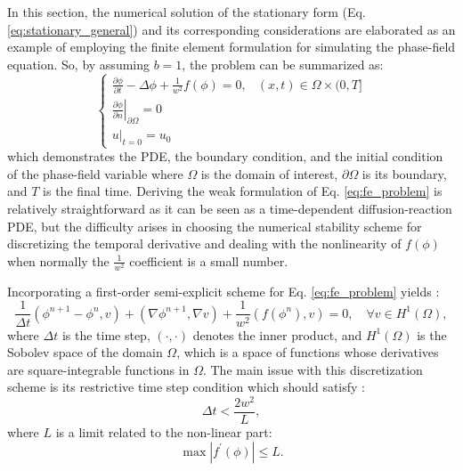In this section, the numerical solution of the stationary form (Eq. \ref{eq:stationary_general}) and its corresponding considerations are elaborated as an example of employing the finite element formulation for simulating the phase-field equation. So, by assuming $b=1$, the problem can be summarized as:
\begin{equation} \label{eq:fe_problem}
\left\{\begin{array}{ll}
\frac{\partial \phi}{\partial t}-\Delta \phi+\frac{1}{w^{2}} f(\phi)=0, & (x, t) \in \Omega \times(0, T] \\
\left.\frac{\partial \phi}{\partial n} \right|_{\partial \Omega}=0 \\
\left.u\right|_{t=0}=u_{0}
\end{array}\right.
\end{equation}
which demonstrates the \gls{PDE}, the boundary condition, and the initial condition of the phase-field variable where $\Omega$ is the domain of interest, $\partial \Omega$ is its boundary, and $T$ is the final time. Deriving the weak formulation of Eq. \ref{eq:fe_problem} is relatively straightforward as it can be seen as a time-dependent diffusion-reaction \gls{PDE}, but the difficulty arises in choosing the numerical stability scheme for discretizing the temporal derivative and dealing with the nonlinearity of $f(\phi)$ when normally the $\frac{1}{w^{2}}$ coefficient is a small number.

Incorporating a first-order semi-explicit scheme for Eq. \ref{eq:fe_problem} yields \cite{Abboud2019}:
\begin{equation} \label{eq:semi-implicit}
\frac{1}{\Delta t}\left(\phi^{n+1}-\phi^{n}, v\right)+\left(\nabla \phi^{n+1}, \nabla v\right)+\frac{1}{w^{2}}\left(f\left(\phi^{n}\right), v\right)=0, \quad \forall v \in H^{1}(\Omega),
\end{equation}
where $\Delta t$ is the time step, $(\cdot,\cdot)$ denotes the inner product, and $H^{1}(\Omega)$ is the Sobolev space of the domain $\Omega$, which is a space of functions whose derivatives are square-integrable functions in $\Omega$. The main issue with this discretization scheme is its restrictive time step condition which should satisfy \cite{Shen2010}:
\begin{equation}
\Delta t < \frac{2w^2}{L},
\end{equation}
where $L$ is a limit related to the non-linear part:
\begin{equation}
\max \left|f^{\prime}(\phi)\right| \leq L.
\end{equation}

